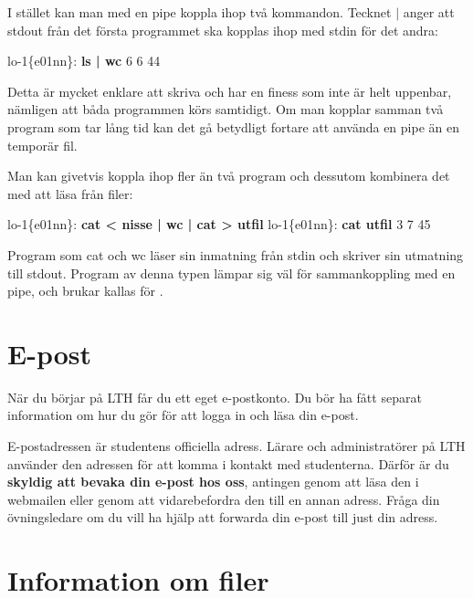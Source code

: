 \documentclass[a4paper,twocolumn]{book}
\begin{document}
I stället kan man med en pipe koppla ihop två kommandon. Tecknet
$\mid$ anger att stdout från det första programmet ska kopplas ihop
med stdin för det andra:
\begin{example}
lo-1\{e01nn\}: \textbf{ls | wc}
       6       6      44
\end{example}
Detta är mycket enklare att skriva och har en finess som inte är helt
uppenbar, nämligen att båda programmen körs samtidigt. Om man kopplar
samman två program som tar lång tid kan det gå betydligt fortare att
använda en pipe än en temporär fil.

Man kan givetvis koppla ihop fler än två program och dessutom
kombinera det med att läsa från filer:
\begin{example}
lo-1\{e01nn\}: \textbf{cat < nisse | wc | cat > utfil}
lo-1\{e01nn\}: \textbf{cat utfil}
       3       7      45
\end{example} 
Program som cat och wc läser sin inmatning från stdin och skriver sin
utmatning till stdout. Program av denna typen lämpar sig väl för
sammankoppling med en pipe, och brukar kallas för .
\section{E-post}

När du börjar på LTH får du ett eget e-postkonto. Du bör ha fått separat information om hur du gör för att logga in och läsa din e-post.

E-postadressen är studentens officiella adress. Lärare och administratörer
på LTH använder den adressen för att komma i kontakt med studenterna.
Därför är du \textbf{skyldig att bevaka din e-post hos oss}, antingen
genom att läsa den i webmailen eller genom att vidarebefordra den till en
annan adress. Fråga din övningsledare om du vill ha hjälp att forwarda din e-post till just din adress.

%

\section{Information om filer}
\end{document}
